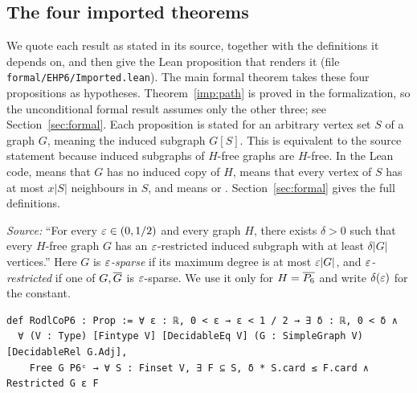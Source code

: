 \subsection{The four imported theorems}\label{sec:imported}
We quote each result as stated in its source, together with the definitions it depends on, and then give
the Lean proposition that renders it (file \texttt{formal/EHP6/Imported.lean}). The main formal theorem
takes these four propositions as hypotheses. Theorem~\ref{imp:path} is proved in the formalization, so
the unconditional formal result assumes only the other three; see Section~\ref{sec:formal}. Each proposition is stated for
an arbitrary vertex set $S$ of a graph $G$, meaning the induced subgraph $G[S]$. This is equivalent to the source statement because induced
subgraphs of $H$-free graphs are $H$-free. In the Lean code,  means that $G$ has no induced
copy of $H$,  means that every vertex of $S$ has at most $x|S|$ neighbours in $S$, and
 means  or . Section~\ref{sec:formal} gives the
full definitions.

\begin{importedthm}\label{imp:rodl}
\emph{Source:} ``For every $\varepsilon\in(0,1/2)$ and every graph $H$, there exists $\delta>0$ such that every
$H$-free graph $G$ has an $\varepsilon$-restricted induced subgraph with at least $\delta|G|$ vertices.'' Here
$G$ is \emph{$\varepsilon$-sparse} if its maximum degree is at most $\varepsilon|G|$, and \emph{$\varepsilon$-restricted} if one
of $G,\overline{G}$ is $\varepsilon$-sparse. We use it only for $H=\overline{P_6}$ and write $\delta(\varepsilon)$ for the constant.
\begin{lstlisting}
def RodlCoP6 : Prop := ∀ ε : ℝ, 0 < ε → ε < 1 / 2 → ∃ δ : ℝ, 0 < δ ∧
  ∀ (V : Type) [Fintype V] [DecidableEq V] (G : SimpleGraph V) [DecidableRel G.Adj],
    Free G P6ᶜ → ∀ S : Finset V, ∃ F ⊆ S, δ * S.card ≤ F.card ∧ Restricted G ε F
\end{lstlisting}
\end{importedthm}

